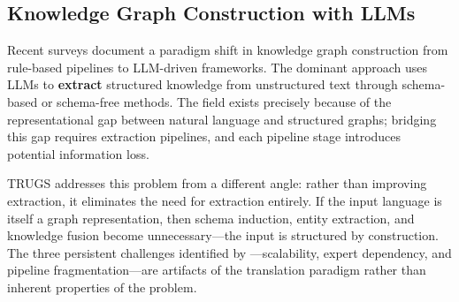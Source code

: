\documentclass{article}
\begin{document}
\begin{table}[h]
\centering
\small
\caption{The earlier systems closest to TRUGS, by the properties TRUGS combines. ``Round trip'' is between the authored artifact and the compiled artifact.}
\label{tab:priorart}
\end{table}

\subsection{Knowledge Graph Construction with LLMs}

Recent surveys \citep{bian2025llm, pan2024unifying} document a paradigm shift in knowledge graph construction from rule-based pipelines to LLM-driven frameworks. The dominant approach uses LLMs to \textbf{extract} structured knowledge from unstructured text through schema-based or schema-free methods. The field exists precisely because of the representational gap between natural language and structured graphs; bridging this gap requires extraction pipelines, and each pipeline stage introduces potential information loss.

TRUGS addresses this problem from a different angle: rather than improving extraction, it eliminates the need for extraction entirely. If the input language is itself a graph representation, then schema induction, entity extraction, and knowledge fusion become unnecessary---the input is structured by construction. The three persistent challenges identified by \citet{bian2025llm}---scalability, expert dependency, and pipeline fragmentation---are artifacts of the translation paradigm rather than inherent properties of the problem.
\end{document}
